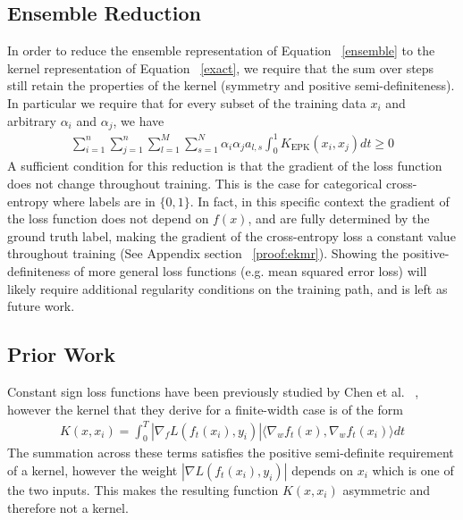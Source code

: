 \subsection{Ensemble Reduction}
In order to reduce the ensemble representation of Equation ~\eqref{ensemble} to the kernel representation of Equation ~\eqref{exact}, we require that the sum over steps still retain the properties of the kernel (symmetry and positive semi-definiteness). In particular we require that for every subset of the training data ${x_i}$ and arbitrary ${\alpha_i}$ and ${\alpha_j}$, we have
\begin{align}
    \sum_{i=1}^n\sum_{j=1}^n \sum_{l=1}^M \sum_{s=1}^N \alpha_i \alpha_j a_{l, s}\int_{0}^1 K_{\text{EPK}}(x_i,x_j) dt \geq 0
\end{align}
A sufficient condition for this reduction is that the gradient of the loss function does not change throughout training. This is the case for categorical cross-entropy where labels are in $\{0,1\}$. In fact, in this specific context the gradient of the loss function does not depend on $f(x)$, and are fully determined by the ground truth label, making the gradient of the cross-entropy loss a constant value throughout training (See Appendix section ~\ref{proof:ekmr}). Showing the positive-definiteness of more general loss functions (e.g. mean squared error loss) will likely require additional regularity conditions on the training path, and is left as future work.

\subsection{Prior Work}
\label{subsec:disc}
Constant sign loss functions have been previously studied by Chen et al. ~\cite{chen2021equivalence}, however the kernel that they derive for a finite-width case is of the form
\begin{align}
    K(x,x_i) =  \int_0^T |\nabla_f L(f_t(x_i), y_i)| \langle \nabla_w f_t(x), \nabla_w f_t(x_i) \rangle dt
\end{align}
The summation across these terms satisfies the positive semi-definite requirement of a kernel, however the weight $|\nabla L(f_t(x_i), y_i)|$ depends on $x_i$ which is one of the two inputs. This makes the resulting function $K(x,x_i)$ asymmetric and therefore not a kernel.

